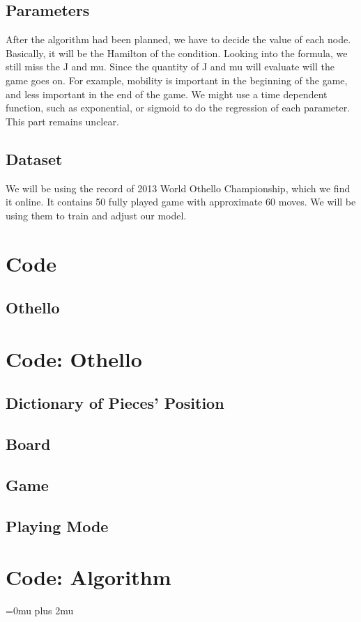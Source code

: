 \documentclass[aps,pra,preprint,amsmath,amssymb,floatfix]{revtex4-2}
\begin{document}
\subsection{Parameters}
After the algorithm had been planned, we have to decide the value of each node. Basically, it will be the Hamilton of the condition. Looking into the formula, we still miss the J and mu. Since the quantity of J and mu will evaluate will the game goes on. For example, mobility is important in the beginning of the game, and less important in the end of the game. We might use a time dependent function, such as exponential, or sigmoid to do the regression of each parameter. This part remains unclear.
\subsection{Dataset}
We will be using the record of 2013 World Othello Championship, which we find it online.\cite{othello_dataset}  It contains 50 fully played game with approximate 60 moves. We will be using them to train and adjust our model.

\section{Code}
\subsection{Othello}



\appendix
\section{Code: Othello}
\subsection{Dictionary of Pieces' Position}

\subsection{Board}

\subsection{Game}

\subsection{Playing Mode}

\section{Code: Algorithm}

\nocite{*}
\Urlmuskip=0mu plus 2mu\relax


\end{document}
